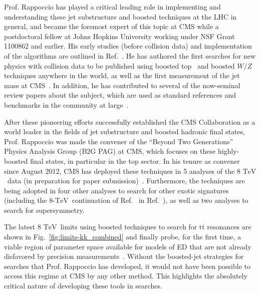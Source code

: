 \documentclass[12pt]{proposalnsf}
\newcommand{\TeV}{\ensuremath{\mathrm{TeV}}}
\newcommand{\ttbar}        {\ensuremath{\mathrm{t}\overline{\mathrm{t}}}}
\begin{document}
Prof. Rappoccio has played a critical leading role in implementing and
understanding these jet substructure and boosted techniques at the LHC
in general, and became the foremost expert of this topic at CMS while
a postdoctoral fellow at Johns Hopkins University working under NSF
Grant 1100862 and earlier. 
His early studies (before collision data) and
implementation of the algorithms are outlined in
Ref.~\cite{catop_cms}. He has authored the first searches
for new physics with collision data to be published using boosted
top~\cite{EXO-11-006} and boosted $W/Z$~\cite{EXO-11-095} techniques
anywhere in the world, as well as the first measurement of the jet
mass at CMS~\cite{SMP-12-019}. In addition, he has contributed to
several of the now-seminal review papers about the subject, which are
used as standard references and benchmarks in the community at
large~\cite{boost2010,boost2011}. 

After these pioneering efforts successfully established the CMS
Collaboration as a world leader in the fields of jet substructure and
boosted hadronic final states, Prof. Rappoccio
was made the convener of the ``Beyond Two Generations'' Physics
Analysis Group (B2G PAG) at CMS, which focuses on these highly-boosted
final states, in particular in the top sector. 
In his tenure as convener since August 2012, CMS has deployed these
techniques in 5 analyses of the 8 \TeV\ data (in preparation for paper 
submission)~\cite{B2G-12-005,B2G-12-006,B2G-12-012,B2G-12-015,B2G-12-019}. 
Furthermore, the techniques are being adopted in four other
analyses to search for other exotic signatures (including the 8-\TeV\
continuation of Ref.~\cite{EXO-11-095} in Ref.~\cite{EXO-12-024}), as
well as two analyses to search for supersymmetry. 

The latest 8 \TeV\ limits using boosted
techniques to search for $\ttbar$ resonances are shown in
Fig.~\ref{fig:limits-kk_combined} and finally probe, for
the first time, a viable region of parameter space available for
models of ED that are not already disfavored by
precision measurements~\cite{Davoudiasl:2009cd}. 
Without the boosted-jet strategies for searches that Prof. Rappoccio has
developed, it would not have been possible to access this regime at
CMS by any other method. This highlights the absolutely critical
nature of developing these tools in searches. 
\end{document}
